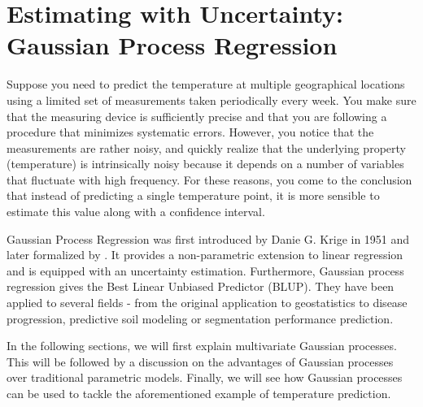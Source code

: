 
\section{Estimating with Uncertainty: Gaussian Process Regression}
Suppose you need to predict the temperature at multiple geographical locations using a limited set of measurements taken periodically every week. You make sure that the measuring device is sufficiently precise and that you are following a procedure that minimizes systematic errors. However, you notice that the measurements are rather noisy, and quickly realize that the underlying property (temperature) is intrinsically noisy because it depends on a number of variables that fluctuate with high frequency. For these reasons, you come to the conclusion that instead of predicting a single temperature point, it is more sensible to estimate this value along with a confidence interval. 

 Gaussian Process Regression was first introduced by Danie G. Krige in 1951 and later formalized by . It provides a non-parametric extension to linear regression and is equipped with an uncertainty estimation. Furthermore, Gaussian process regression gives the Best Linear Unbiased Predictor (BLUP). They have been applied to several fields - from the original application to geostatistics to disease progression, predictive soil modeling or segmentation performance prediction.

In the following sections, we will first explain multivariate Gaussian processes. This will be followed by a discussion on the advantages of Gaussian processes over traditional parametric models. Finally, we will see how Gaussian processes can be used to tackle the aforementioned example of temperature prediction.



